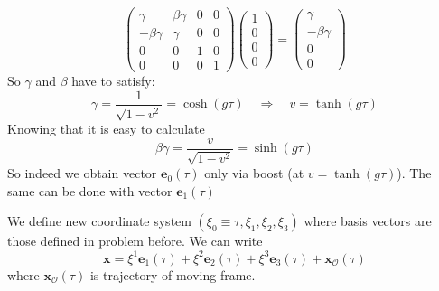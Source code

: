 \begin{equation}
	\begin{pmatrix}
		\gamma       & \beta\gamma & 0 & 0 \\
		-\beta\gamma & \gamma      & 0 & 0 \\
		0            & 0           & 1 & 0 \\
		0            & 0           & 0 & 1
	\end{pmatrix}
	\begin{pmatrix}
		1 \\
		0 \\
		0 \\
		0
	\end{pmatrix}
	=
	\begin{pmatrix}
		\gamma       \\
		-\beta\gamma \\
		0            \\
		0
	\end{pmatrix}
\end{equation}
%
So $\gamma$ and $\beta$ have to satisfy:
%
\begin{equation}
	\gamma = \frac{1}{\sqrt{1-v^2}} = \cosh(g\tau) \quad \Rightarrow \quad v = \tanh(g\tau)
\end{equation}
%
Knowing that it is easy to calculate
%
\begin{equation}
	\beta\gamma = \frac{v}{\sqrt{1-v^2}} = \sinh(g\tau)
\end{equation}
%
So indeed we obtain vector $\boldsymbol{e}_0(\tau)$ only via boost (at
$v=\tanh(g\tau)$). The same can be done with vector $\boldsymbol{e}_1(\tau)$

\problem

We define new coordinate system $(\xi_0\equiv\tau, \xi_1, \xi_2, \xi_3)$ where
basis vectors are those defined in problem before. We can write
%
\begin{equation}
	\boldsymbol{x} = \xi^1\boldsymbol{e}_1(\tau) + \xi^2\boldsymbol{e}_2(\tau) +
	\xi^3\boldsymbol{e}_3(\tau) + \boldsymbol{x}_\mathcal{O}(\tau)
\end{equation}
%
where $\boldsymbol{x}_\mathcal{O}(\tau)$ is trajectory of moving frame.

